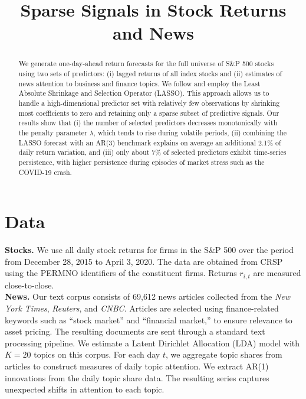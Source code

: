 \documentclass[10pt,twocolumn]{article}
\title{\vspace{-6pt}\textbf{Sparse Signals in Stock Returns and News}\vspace{-4pt}}
\date{}
\begin{document}
\maketitle
\vspace{-18pt}

\begin{abstract}
\noindent
We generate one-day-ahead return forecasts for the full universe of S\&P 500 stocks using two sets of predictors: (i) lagged returns of all index stocks and (ii) estimates of news attention to business and finance topics. We follow \cite{chinco2019sparse} and employ the Least Absolute Shrinkage and Selection Operator (LASSO). This approach allows us to handle a high-dimensional predictor set with relatively few observations by shrinking most coefficients to zero and retaining only a sparse subset of predictive signals. 
Our results show that (i) the number of selected predictors decreases monotonically with the penalty parameter $\lambda$, which tends to rise during volatile periods, (ii) combining the LASSO forecast with an AR(3) benchmark explains on average an additional 2.1\% of daily return variation, and (iii) only about 7\% of selected predictors exhibit time-series persistence, with higher persistence during episodes of market stress such as the COVID-19 crash.
\end{abstract}

\section{Data}
\label{sec:data}

\textbf{Stocks.} We use all daily stock returns for firms in the S\&P 500 over the period from December 28, 2015 to April 3, 2020. The data are obtained from CRSP using the PERMNO identifiers of the constituent firms. Returns $r_{i,t}$ are measured close-to-close.\\
\textbf{News.} Our text corpus consists of 69{,}612 news articles collected from the \emph{New York Times}, \textit{Reuters}, and \textit{CNBC}. Articles are selected using finance-related keywords such as ``stock market'' and ``financial market,'' to ensure relevance to asset pricing. The resulting documents are sent through a standard text processing pipeline. We estimate a Latent Dirichlet Allocation (LDA) model with $K=20$ topics on this corpus. For each day $t$, we aggregate topic shares from articles to construct measures of daily topic attention. We extract AR(1) innovations from the daily topic share data. The resulting series captures unexpected shifts in attention to each topic.
\end{document}
